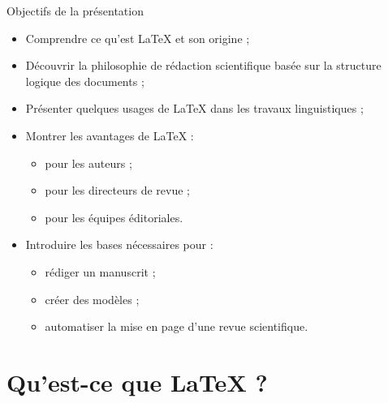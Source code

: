 \documentclass[aspectratio=169]{beamer}
\begin{document}
	
	\begin{frame}{Objectifs de la présentation}
		\begin{itemize}
			\item Comprendre ce qu’est \LaTeX{} et son origine ;
			
			\vspace{0.2cm}
			
			\item Découvrir la philosophie de rédaction scientifique basée sur la structure logique des documents ;
			
			\vspace{0.2cm}
			
			\item Présenter quelques usages de \LaTeX{} dans les travaux linguistiques ;
			
			\vspace{0.2cm}
			
			\item Montrer les avantages de \LaTeX{} :
			\begin{itemize}
				\item pour les auteurs ;
				\item pour les directeurs de revue ;
				\item pour les équipes éditoriales.
			\end{itemize}
			
			\vspace{0.2cm}
			
			\item Introduire les bases nécessaires pour :
			\begin{itemize}
				\item rédiger un manuscrit ;
				\item créer des modèles ;
				\item automatiser la mise en page d’une revue scientifique.
			\end{itemize}
		\end{itemize}
	\end{frame}
	
	
	\section{Qu’est-ce que \LaTeX{} ?}
	
\end{document}
